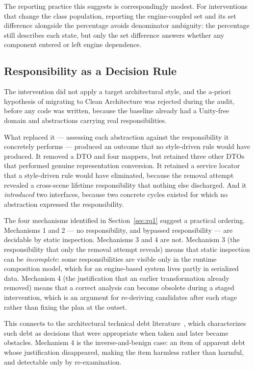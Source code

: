 \documentclass[pdflatex,sn-basic]{sn-jnl}
\begin{document}
The reporting practice this suggests is correspondingly modest. For interventions that change the class population, reporting the engine-coupled set and its set difference alongside the percentage avoids denominator ambiguity: the percentage still describes each state, but only the set difference answers whether any component entered or left engine dependence.

\subsection{Responsibility as a Decision Rule}

The intervention did not apply a target architectural style, and the a-priori hypothesis of migrating to Clean Architecture was rejected during the audit, before any code was written, because the baseline already had a Unity-free domain and abstractions carrying real responsibilities.

What replaced it --- assessing each abstraction against the responsibility it concretely performs --- produced an outcome that no style-driven rule would have produced. It removed a DTO and four mappers, but retained three other DTOs that performed genuine representation conversion. It retained a service locator that a style-driven rule would have eliminated, because the removal attempt revealed a cross-scene lifetime responsibility that nothing else discharged. And it \emph{introduced} two interfaces, because two concrete cycles existed for which no abstraction expressed the responsibility.

The four mechanisms identified in Section~\ref{sec:rq1} suggest a practical ordering. Mechanisms 1 and 2 --- no responsibility, and bypassed responsibility --- are decidable by static inspection. Mechanisms 3 and 4 are not. Mechanism 3 (the responsibility that only the removal attempt reveals) means that static inspection can be \emph{incomplete}: some responsibilities are visible only in the runtime composition model, which for an engine-based system lives partly in serialized data. Mechanism 4 (the justification that an earlier transformation already removed) means that a correct analysis can become obsolete during a staged intervention, which is an argument for re-deriving candidates after each stage rather than fixing the plan at the outset.

This connects to the architectural technical debt literature~\citep{verdecchia2020,verdecchia2021}, which characterizes such debt as decisions that were appropriate when taken and later became obstacles. Mechanism 4 is the inverse-and-benign case: an item of apparent debt whose justification disappeared, making the item harmless rather than harmful, and detectable only by re-examination.
\end{document}
